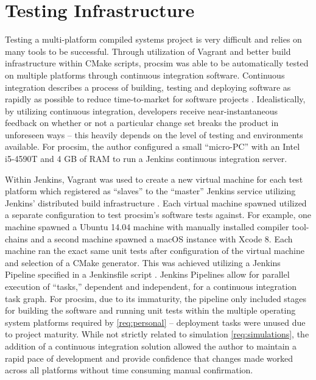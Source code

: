 \section{Testing Infrastructure}

Testing a multi-platform compiled systems project is very difficult and relies on many tools to be successful. Through utilization of Vagrant and better build infrastructure within CMake scripts, procsim was able to be automatically tested on multiple platforms through continuous integration software. Continuous integration describes a process of building, testing and deploying software as rapidly as possible to reduce time-to-market for software projects \cite{Stolberg2009}. Idealistically, by utilizing continuous integration, developers receive near-instantaneous feedback on whether or not a particular change set breaks the product in unforeseen ways -- this heavily depends on the level of testing and environments available. For procsim, the author configured a small ``micro-PC'' with an Intel \textregistered{} i5-4590T and 4 GB of RAM to run a Jenkins \cite{Jenkins:Home} continuous integration server. 

Within Jenkins, Vagrant was used to create a new virtual machine for each test platform which registered as ``slaves'' to the ``master'' Jenkins service utilizing Jenkins' distributed build infrastructure \cite{Jenkins:DistributedBuilds}. Each virtual machine spawned utilized a separate configuration to test procsim's software tests against. For example, one machine spawned a Ubuntu 14.04 machine with manually installed compiler tool-chains and a second machine spawned a macOS instance with Xcode 8. Each machine ran the exact same unit tests after configuration of the virtual machine and selection of a CMake generator. This was achieved utilizing a Jenkins Pipeline \cite{Jenkins:Pipeline} specified in a Jenkinsfile script \cite{Jenkins:Pipeline:Jenkinsfile}. Jenkins Pipelines allow for parallel execution of ``tasks,'' dependent and independent, for a continuous integration task graph. For procsim, due to its immaturity, the pipeline only included stages for building the software and running unit tests within the multiple operating system platforms required by \cref{req:personal} -- deployment tasks were unused due to project maturity. While not strictly related to simulation \cref{req:simulations}, the addition of a continuous integration solution allowed the author to maintain a rapid pace of development and provide confidence that changes made worked across all platforms without time consuming manual confirmation.

